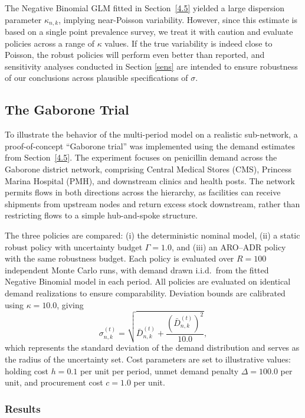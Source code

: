 \documentclass{article}
\begin{document}
The Negative Binomial GLM fitted in Section~\ref{4.5} yielded a large dispersion parameter $\kappa_{n,k}$, implying near-Poisson variability. However, since this estimate is based on a single point prevalence survey, we treat it with caution and evaluate policies across a range of $\kappa$ values. If the true variability is indeed close to Poisson, the robust policies will perform even better than reported, and sensitivity analyses conducted in Section \ref{sens} are intended to ensure robustness of our conclusions across plausible specifications of \(\sigma\). 

\subsection{The Gaborone Trial}
\label{5.3}

To illustrate the behavior of the multi-period model on a realistic sub-network, a proof-of-concept ``Gaborone trial'' was implemented using the demand estimates from Section~\ref{4.5}. The experiment focuses on penicillin demand across the Gaborone district network, comprising Central Medical Stores (CMS), Princess Marina Hospital (PMH), and downstream clinics and health posts. The network permits flows in both directions across the hierarchy, as facilities can receive shipments from upstream nodes and return excess stock downstream, rather than restricting flows to a simple hub-and-spoke structure.

The three policies are compared: (i) the deterministic nominal model, (ii) a static robust policy with uncertainty budget $\Gamma = 1.0$, and (iii) an 
ARO--ADR policy with the same robustness budget. Each policy is evaluated over $R = 100$ independent Monte Carlo runs, with demand drawn i.i.d.\ from the fitted Negative Binomial model in each period. All policies are evaluated on identical demand realizations to ensure comparability. Deviation bounds are calibrated using $\kappa = 10.0$, giving
\[
    \sigma^{(t)}_{n,k} = \sqrt{\bar{D}^{(t)}_{n,k} + 
    \frac{(\bar{D}^{(t)}_{n,k})^2}{10.0}},
\]
which represents the standard deviation of the demand distribution and serves as the radius of the uncertainty set. Cost parameters are set to 
illustrative values: holding cost $h = 0.1$ per unit per period, unmet demand penalty $\Delta = 100.0$ per unit, and procurement cost $c = 1.0$ per unit.

\subsubsection{Results}
\end{document}
